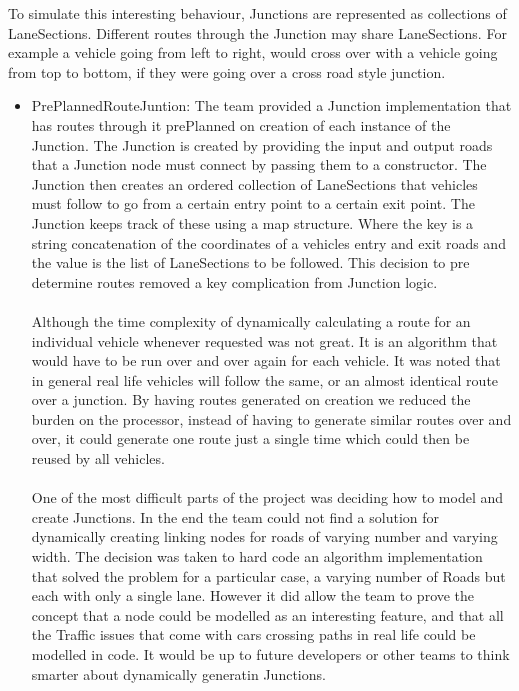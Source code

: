 \documentclass[11pt]{article}
\begin{document}
{\begin{itemize}
    To simulate this interesting behaviour, Junctions are represented as collections of LaneSections. Different routes through the Junction may share LaneSections. For example a vehicle going from left to right, would cross over with a vehicle going from top to bottom, if they were going over a cross road style junction.
    
    \begin{itemize}[noitemsep]
    \item PrePlannedRouteJuntion: The team provided a Junction implementation that has routes through it prePlanned on creation of each instance of the Junction. The Junction is created by providing the input and output roads that a Junction node must connect by passing them to a constructor. The Junction then creates an ordered collection of LaneSections that vehicles must follow to go from a certain entry point to a certain exit point. The Junction keeps track of these using a map structure. Where the key is a string concatenation of the coordinates of a vehicles entry and exit roads and the value is the list of LaneSections to be followed. This decision to pre determine routes removed a key complication from Junction logic. 
    \\~\\
    Although the time complexity of dynamically calculating a route for an individual vehicle whenever requested was not great. It is an algorithm that would have to be run over and over again for each vehicle. It was noted that in general real life vehicles will follow the same, or an almost identical route over a junction. By having routes generated on creation we reduced the burden on the processor, instead of having to generate similar routes over and over, it could generate one route just a single time which could then be reused by all vehicles.
    \\~\\
    One of the most difficult parts of the project was deciding how to model and create Junctions. In the end the team could not find a solution for dynamically creating linking nodes for roads of varying number and varying width. The decision was taken to hard code an algorithm implementation that solved the problem for a particular case, a varying number of Roads but each with only a single lane. However it did allow the team to prove the concept that a node could be modelled as an interesting feature, and that all the Traffic issues that come with cars crossing paths in real life could be modelled in code. It would be up to future developers or other teams to think smarter about dynamically generatin Junctions.
    

\end{itemize}
\end{itemize}}
\end{document}

